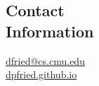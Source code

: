 \documentclass[10.5pt,resmargin,line]{resume}
\newcommand{\mailto}[1]{
  \href{mailto:#1}{#1}
}
\begin{document}
\begin{resume}

\section{Contact\\Information}
\mailto{dfried@cs.cmu.edu} \\
{\small \url{dpfried.github.io}}







\end{resume}
\end{document}
